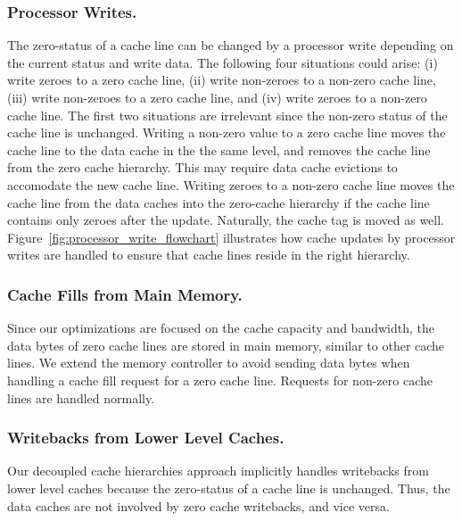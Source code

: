 \subsubsection{Processor Writes.}

The zero-status of a cache line can be changed by a processor write depending on the current status and write data.  The following four situations could arise: (i) write zeroes to a zero cache line, (ii) write non-zeroes to a non-zero cache line, (iii) write non-zeroes to a zero cache line, and (iv) write zeroes to a non-zero cache line.  The first two situations are irrelevant since the non-zero status of the cache line is unchanged.  Writing a non-zero value to a zero cache line moves the cache line to the data cache in the the same level, and removes the cache line from the zero cache hierarchy.  This may require data cache evictions to accomodate the new cache line.  Writing zeroes to a non-zero cache line moves the cache line from the data caches into the zero-cache hierarchy if the cache line contains only zeroes after the update.  Naturally, the cache tag is moved as well.  Figure~\ref{fig:processor_write_flowchart} illustrates how cache updates by processor writes are handled to ensure that cache lines reside in the right hierarchy.  

\subsubsection{Cache Fills from Main Memory.} 

Since our optimizations are focused on the cache capacity and bandwidth, the data bytes of zero cache lines are stored in main memory, similar to other cache lines.  We extend the memory controller to avoid sending data bytes when handling a cache fill request for a zero cache line.  Requests for non-zero cache lines are handled normally. 

\subsubsection{Writebacks from Lower Level Caches.}

Our decoupled cache hierarchies approach implicitly handles writebacks from lower level caches because the zero-status of a cache line is unchanged.  Thus, the data caches are not involved by zero cache writebacks, and vice versa.   


